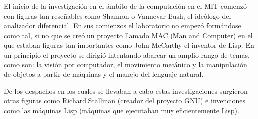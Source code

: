 \vspace{10px}

El inicio de la investigación en el ámbito de la computación en el MIT comenzó con figuras tan reseñables como Shannon o Vannevar Bush, el ideólogo del analizador diferencial. En sus comienzos el laboratorio no empezó formándose como tal, si no que se creó un proyecto llamado MAC (Man and Computer) en el que estaban figuras tan importantes como John McCarthy el inventor de Lisp. En un principio el proyecto se dirigió intentando abarcar un amplio rango de temas, como son: la visión por computador, el movimiento mecánico y la manipulación de objetos a partir de máquinas y el manejo del lenguaje natural.

\vspace{10px}
De los despachos en los cuales se llevaban a cabo estas investigaciones surgieron otras figuras como Richard Stallman (creador del proyecto GNU) e invenciones como las máquinas Lisp (máquinas que ejecutaban muy eficientemente Lisp).

